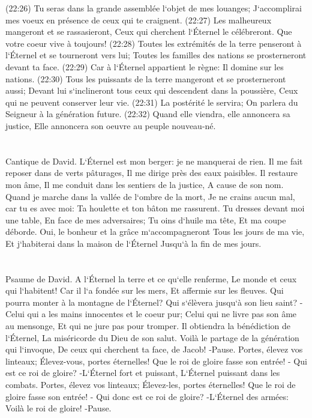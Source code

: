 \verse (22:26) Tu seras dans la grande assemblée l`objet de mes louanges; J`accomplirai mes voeux en présence de ceux qui te craignent. 
\verse (22:27) Les malheureux mangeront et se rassasieront, Ceux qui cherchent l`Éternel le célébreront. Que votre coeur vive à toujours! 
\verse (22:28) Toutes les extrémités de la terre penseront à l`Éternel et se tourneront vers lui; Toutes les familles des nations se prosterneront devant ta face. 
\verse (22:29) Car à l`Éternel appartient le règne: Il domine sur les nations. 
\verse (22:30) Tous les puissants de la terre mangeront et se prosterneront aussi; Devant lui s`inclineront tous ceux qui descendent dans la poussière, Ceux qui ne peuvent conserver leur vie. 
\verse (22:31) La postérité le servira; On parlera du Seigneur à la génération future. 
\verse (22:32) Quand elle viendra, elle annoncera sa justice, Elle annoncera son oeuvre au peuple nouveau-né. 

\chapter{}

\verse Cantique de David. L`Éternel est mon berger: je ne manquerai de rien. 
\verse Il me fait reposer dans de verts pâturages, Il me dirige près des eaux paisibles. 
\verse Il restaure mon âme, Il me conduit dans les sentiers de la justice, A cause de son nom. 
\verse Quand je marche dans la vallée de l`ombre de la mort, Je ne crains aucun mal, car tu es avec moi: Ta houlette et ton bâton me rassurent. 
\verse Tu dresses devant moi une table, En face de mes adversaires; Tu oins d`huile ma tête, Et ma coupe déborde. 
\verse Oui, le bonheur et la grâce m`accompagneront Tous les jours de ma vie, Et j`habiterai dans la maison de l`Éternel Jusqu`à la fin de mes jours. 

\chapter{}

\verse Psaume de David. A l`Éternel la terre et ce qu`elle renferme, Le monde et ceux qui l`habitent! 
\verse Car il l`a fondée sur les mers, Et affermie sur les fleuves. 
\verse Qui pourra monter à la montagne de l`Éternel? Qui s`élèvera jusqu`à son lieu saint? - 
\verse Celui qui a les mains innocentes et le coeur pur; Celui qui ne livre pas son âme au mensonge, Et qui ne jure pas pour tromper. 
\verse Il obtiendra la bénédiction de l`Éternel, La miséricorde du Dieu de son salut. 
\verse Voilà le partage de la génération qui l`invoque, De ceux qui cherchent ta face, de Jacob! -Pause. 
\verse Portes, élevez vos linteaux; Élevez-vous, portes éternelles! Que le roi de gloire fasse son entrée! - 
\verse Qui est ce roi de gloire? -L`Éternel fort et puissant, L`Éternel puissant dans les combats. 
\verse Portes, élevez vos linteaux; Élevez-les, portes éternelles! Que le roi de gloire fasse son entrée! - 
\verse Qui donc est ce roi de gloire? -L`Éternel des armées: Voilà le roi de gloire! -Pause. 

